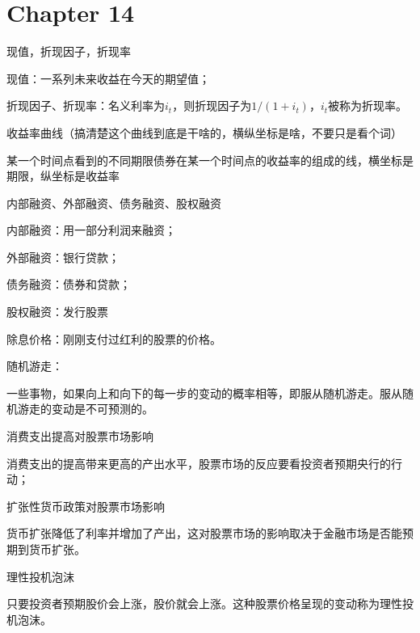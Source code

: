 \documentclass{article}
\begin{document}
\section{Chapter 14}

现值，折现因子，折现率

现值：一系列未来收益在今天的期望值；

折现因子、折现率：名义利率为$ i_t $，则折现因子为$ 1/(1+i_t) $，$ i_t $被称为折现率。

\hspace*{\fill}

收益率曲线（搞清楚这个曲线到底是干啥的，横纵坐标是啥，不要只是看个词）

某一个时间点看到的不同期限债券在某一个时间点的收益率的组成的线，横坐标是期限，纵坐标是收益率

\hspace*{\fill}

内部融资、外部融资、债务融资、股权融资

内部融资：用一部分利润来融资；

外部融资：银行贷款；

债务融资：债券和贷款；

股权融资：发行股票

\hspace*{\fill}

除息价格：刚刚支付过红利的股票的价格。

\hspace*{\fill}

随机游走：

一些事物，如果向上和向下的每一步的变动的概率相等，即服从随机游走。服从随机游走的变动是不可预测的。

\hspace*{\fill}

消费支出提高对股票市场影响

消费支出的提高带来更高的产出水平，股票市场的反应要看投资者预期央行的行动；

\hspace*{\fill}

扩张性货币政策对股票市场影响

货币扩张降低了利率并增加了产出，这对股票市场的影响取决于金融市场是否能预期到货币扩张。

\hspace*{\fill}

理性投机泡沫

只要投资者预期股价会上涨，股价就会上涨。这种股票价格呈现的变动称为理性投机泡沫。

\hspace*{\fill}
\end{document}
